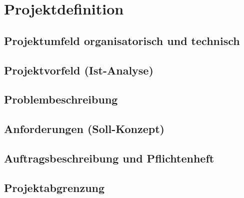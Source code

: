 \section{Projektdefinition}
\label{sec:Projektdefinition}


\subsection{Projektumfeld organisatorisch und technisch} 
\label{sec:Projektumfeld organisatorisch und technisch}


\subsection{Projektvorfeld (Ist-Analyse)} 
\label{sec:Projektvorfeld (Ist-Analyse)}


\subsection{Problembeschreibung} 
\label{sec:Problembeschreibung}


\subsection{Anforderungen (Soll-Konzept)} 
\label{sec:Anforderungen (Soll-Konzept)}



\subsection{Auftragsbeschreibung und Pflichtenheft} 
\label{sec:Auftragsbeschreibung und Pflichtenheft}


\subsection{Projektabgrenzung} 
\label{sec:Projektabgrenzung}

